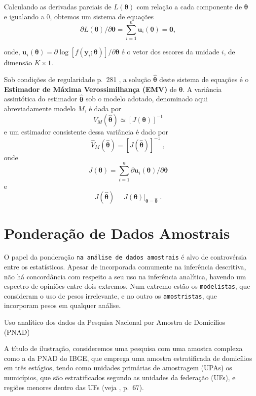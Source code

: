 \documentclass[]{book}
\theoremstyle{definition}
\theoremstyle{definition}
\theoremstyle{definition}
\theoremstyle{remark}
\let\BeginKnitrBlock\begin \let\EndKnitrBlock\end
\begin{document}
Calculando as derivadas parciais de \(L\left(\mathbf{\theta}\right)\)
com relação a cada componente de \(\mathbf{\theta }\) e igualando a
\(0\), obtemos um sistema de equações \[
\partial L\left( \mathbf{\theta }\right) /\partial \mathbf{\theta }=
\sum_{i=1}^n\mathbf{u}_{i}\left( \mathbf{\theta }\right) =\mathbf{0}, 
\]

onde,
\(\mathbf{u}_{i}\left(\mathbf{\theta }\right) =\partial\log\left[f\left(\mathbf{y}_{i};\mathbf{\theta}\right) \right] /\partial \mathbf{\theta }\)
é o vetor dos escores da unidade \(i\), de dimensão \(K\times1\).

Sob condições de regularidade p.~281 \citep{cox}, a solução
\(\mathbf{\hat{\theta}}\) deste sistema de equações é o
\textbf{Estimador de Máxima Verossimilhança (EMV)} de
\(\mathbf{\theta}\). A variância assintótica do estimador
\(\mathbf{\hat{\theta}}\) sob o modelo adotado, denominado aqui
abreviadamente modelo \(M\), é dada por \[
V_{M}\left( \mathbf{\hat{\theta}}\right) \simeq \left[ J\left( \mathbf{
\theta }\right) \right] ^{-1} 
\] e um estimador consistente dessa variância é dado por \[
\hat{V}_{M}\left( \mathbf{\hat{\theta}}\right) =\left[ J\left( \mathbf{\hat{
\theta}}\right) \right] ^{-1}\;, 
\] onde \[
J\left( \mathbf{\theta }\right) =\sum\limits_{i=1}^{n}\partial \mathbf{u}
_{i}\left( \mathbf{\theta }\right) /\partial \mathbf{\theta } 
\] e \[
J\left( \mathbf{\hat{\theta}}\right) =\left. J\left( \mathbf{\theta }\right)
\right| _{\mathbf{\theta =\hat{\theta}}}\;. 
\]

\section{Ponderação de Dados
Amostrais}\label{ponderacao-de-dados-amostrais}

O papel da ponderação \texttt{na\ análise\ de\ dados\ amostrais} é alvo
de controvérsia entre os estatísticos. Apesar de incorporada comumente
na inferência descritiva, não há concordância com respeito a seu uso na
inferência analítica, havendo um espectro de opiniões entre dois
extremos. Num extremo estão os \texttt{modelistas}, que consideram o uso
de pesos irrelevante, e no outro os \texttt{amostristas}, que incorporam
pesos em qualquer análise.

\BeginKnitrBlock{example}
\protect\hypertarget{exm:pnad}{}{\label{exm:pnad} }Uso analítico dos dados
da Pesquisa Nacional por Amostra de Domicílios (PNAD)
\EndKnitrBlock{example}

A título de ilustração, consideremos uma pesquisa com uma amostra
complexa como a da PNAD do IBGE, que emprega uma amostra estratificada
de domicílios em três estágios, tendo como unidades primárias de
amostragem (UPAs) os municípios, que são estratificados segundo as
unidades da federação (UFs), e regiões menores dentro das UFs (veja
\citep{IBGE81}, p.~67).
\end{document}
